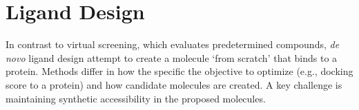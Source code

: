 \section{Ligand Design} 

In contrast to virtual screening, which evaluates predetermined compounds, \textit{de novo} ligand design attempt to create a molecule `from scratch' that binds to a protein.  Methods differ in how the specific the objective to optimize (e.g., docking score to a protein) and how candidate molecules are created.  A key challenge is maintaining synthetic accessibility in the proposed molecules.